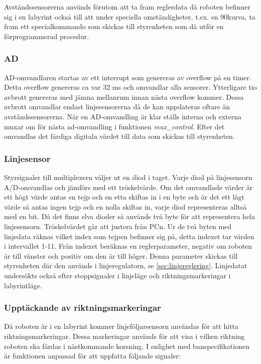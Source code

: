 Avståndssensorerna används förutom att ta fram reglerdata då roboten befinner sig i en labyrint 
också till att under speciella omständigheter, t.ex. en 90\degree kurva, ta fram ett specialkommando
som skickas till styrenheten som då utför en förprogrammerad procedur.

\subsubsection{AD}
AD-omvandlaren startas av ett interrupt som genereras av overflow på en timer.
Detta overflow genereras ca var 32 ms och omvandlar alla sensorer. 
Ytterligare tio avbrott genereras med jämna mellanrum innan nästa overflow 
kommer. Dessa avbrott omvandlar endast linjesensorerna då de kan uppdateras
oftare än avståndssensorerna. När en AD-omvandling är klar ställs interna och 
externa muxar om för nästa ad-omvandling i funktionen \emph{mux\_control}. Efter 
det omvandlas det färdiga digitala värdet till data som skickas till
styrenheten.

\subsubsection{Linjesensor}
\label{sec:linjesensor}
Styrsignaler till multiplexern väljer ut en diod i taget.
Varje diod på linjesensorn A/D-omvandlas och jämförs med ett tröskelvärde. Om
det omvandlade värder är
ett högt värde antas en tejp och en etta skiftas in i en byte och är det 
ett lågt värde så antas ingen tejp och en nolla skiftas in, varje diod
representeras alltså med en bit. Då det finns elva dioder så används två byte 
för att representera hela linjesensorn. Tröskelvärdet går att justera från PCn. 
Ur de två byten med linjedata räknas vilket index som tejpen befinner sig på,
detta indexet tar värden i intervallet 1-11. Från indexet beräknas en
reglerparameter, negativ om roboten är till vänster och positiv om den är till
höger. Denna parameter skickas till styrenheten där den används i
linjeregulatorn, se \ref{sec:linjereglering}. Linjedatat undersökts också efter
stoppsignaler i linjeläge och riktningsmarkeringar i labyrintläge.

\subsubsection{Upptäckande av riktningsmarkeringar}
\label{sec:riktmark}
Då roboten är i en labyrint kommer linjeföljarsensorn användas 
för att hitta riktningsmarkeringar. Dessa markeringar används för att visa i 
vilken riktning roboten ska färdas i nästkommande korsning.  I enlighet med 
banspecifikationen är funktionen anpassad för att uppfatta 
följande signaler:

